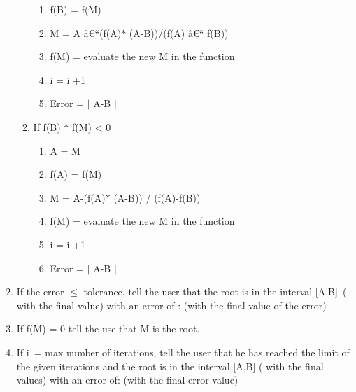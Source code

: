\documentclass[10pt]{article}
\renewcommand{\_}{\kern-1.5pt\textunderscore\kern-1.5pt}
\begin{document}
\begin{enumerate}
\begin{enumerate}
\begin{enumerate}
	\item  f(B) = f(M)\par

	\item M = A â€“(f(A)$\ast$ (A-B))/(f(A) â€“ f(B))\par

	\item f(M) = evaluate the new M in the function\par

	\item i = i +1\par

	\item Error = $ \vert $ A-B $ \vert $ \par


\end{enumerate}
	\item If f(B) $\ast$  f(M) < 0\par

\begin{enumerate}
	\item A = M \par

	\item f(A) = f(M)\par

	\item M = A-(f(A)$\ast$ (A-B)) / (f(A)-f(B))\par

	\item f(M) = evaluate the new M in the function \par

	\item i = i +1\par

	\item Error = $ \vert $ A-B $ \vert $ \par


\end{enumerate}
\end{enumerate}
	\item If the error $ \leq $  tolerance, tell the user that the root is in the interval [A,B]\ ( with the final value) with an error of : \_\_\_ (with the final value of the error)\par

	\item If f(M) = 0 tell the use that M is the root.\par

	\item If i\ = max number of iterations, tell the user that he has reached the limit of the given iterations and the root is in the interval [A,B] ( with the final values) with an error of: \_\_\_\_ (with the final error value)
\end{enumerate}\par


\vspace{\baselineskip}

\printbibliography
\end{document}
